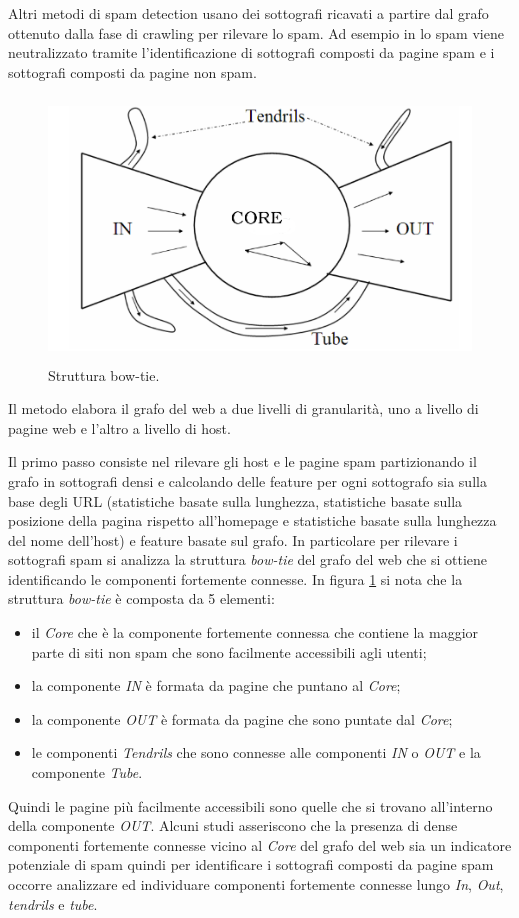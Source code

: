 Altri metodi di spam detection usano dei sottografi ricavati a partire dal grafo ottenuto dalla fase di crawling per rilevare lo spam. Ad esempio in \cite{Leon-Suematsu:2011:WSD:2052138.2052339} lo spam viene neutralizzato tramite l'identificazione di sottografi composti da pagine spam e i sottografi composti da pagine non spam.  
\begin{figure}
\centering
\includegraphics[height=7cm]{immagini/sub/sub}
\caption{Struttura bow-tie.}
\label{fig:sub}
\end{figure}
Il metodo elabora il grafo del web a due livelli di granularità, uno a livello di pagine web  e l'altro a livello di host. 

Il primo passo consiste nel rilevare gli host e le pagine spam partizionando il grafo in sottografi densi e calcolando delle feature per ogni sottografo sia sulla base degli URL (statistiche basate sulla lunghezza, statistiche basate sulla posizione della pagina rispetto all'homepage e statistiche basate sulla lunghezza del nome dell'host) e feature basate sul grafo. In particolare per rilevare i sottografi spam si analizza la struttura \textit{bow-tie} del grafo del web che si ottiene identificando le componenti fortemente connesse. In figura \ref{fig:sub} si nota che la struttura \textit{bow-tie} è composta da 5 elementi:
\begin{itemize}
 \item il \textit{Core} che è la componente fortemente connessa che contiene la maggior parte di siti non spam che sono facilmente accessibili agli utenti;
 \item la componente \textit{IN} è formata da pagine che puntano al \textit{Core};
 \item la componente \textit{OUT} è formata da pagine che sono puntate dal \textit{Core};
 \item le componenti \textit{Tendrils} che sono connesse alle componenti \textit{IN} o \textit{OUT} e la componente \textit{Tube}.
\end{itemize}
Quindi le pagine più facilmente accessibili sono quelle che si trovano all'interno della componente \textit{OUT}. Alcuni studi asseriscono che la presenza di dense componenti fortemente connesse vicino al \textit{Core} del grafo del web sia un indicatore potenziale di spam quindi per identificare i sottografi composti da pagine spam occorre analizzare ed individuare componenti fortemente connesse lungo \textit{In}, \textit{Out}, \textit{tendrils} e \textit{tube}.

